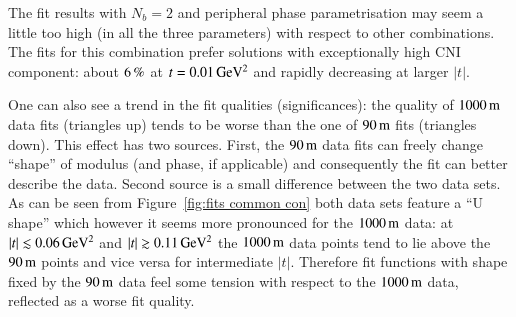 The fit results with $N_b = 2$ and peripheral phase parametrisation may seem a little too high (in all the three parameters) with respect to other combinations. The fits for this combination prefer solutions with exceptionally high CNI component: about $6\,{\rm \%}$ at $t = 0.01\,{\rm GeV^2}$ and rapidly decreasing at larger $|t|$. 

One can also see a trend in the fit qualities (significances): the quality of $1000\,{\rm m}$ data fits (triangles up) tends to be worse than the one of $90\,{\rm m}$ fits (triangles down). This effect has two sources. First, the $90\,{\rm m}$ data fits can freely change ``shape'' of modulus (and phase, if applicable) and consequently the fit can better describe the data. Second source is a small difference between the two data sets. As can be seen from Figure~\ref{fig:fits common con} both data sets feature a ``U shape'' which however it seems more pronounced for the $1000\,{\rm m}$ data: at $|t| \lesssim 0.06\,{\rm GeV^2}$ and $|t| \gtrsim 0.11\,{\rm GeV^2}$ the $1000\,{\rm m}$ data points tend to lie above the $90\,{\rm m}$ points and vice versa for intermediate $|t|$. Therefore fit functions with shape fixed by the $90\,{\rm m}$ data feel some tension with respect to the $1000\,{\rm m}$ data, reflected as a worse fit quality.
